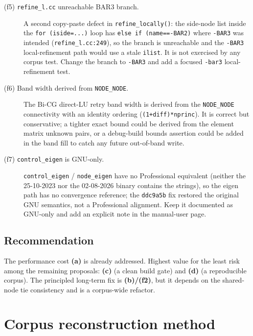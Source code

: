 \documentclass[11pt,a4paper]{report}
\newcommand{\code}[1]{\texttt{#1}}
\begin{document}
\begin{description}
  \item[(f5) \code{refine\_\allowbreak l.cc} unreachable BAR3 branch.] A second copy-paste
        defect in \code{refine\_\allowbreak locally()}: the side-node list inside the
        \code{for (iside=...)} loop has \code{else if (name==-BAR2)} where
        \code{-BAR3} was intended (\code{refine\_\allowbreak l.cc:249}), so the branch is
        unreachable and the \code{-BAR3} local-refinement path would use a stale
        \code{ilist}. It is not exercised by any corpus test. Change the branch
        to \code{-BAR3} and add a focused \code{-bar3} local-refinement test.

  \item[(f6) Band width derived from \code{NODE\_\allowbreak NODE}.] The Bi-CG direct-LU
        retry band width is derived from the \code{NODE\_\allowbreak NODE} connectivity with
        an identity ordering (\code{(1+diff)*nprinc}). It is correct but
        conservative; a tighter exact bound could be derived from the element
        matrix unknown pairs, or a debug-build bounds assertion could be added in
        the band fill to catch any future out-of-band write.

  \item[(f7) \code{control\_\allowbreak eigen} is GNU-only.] \code{control\_\allowbreak eigen} /
        \code{node\_\allowbreak eigen} have no Professional equivalent (neither the
        25-10-2023 nor the 02-08-2026 binary contains the strings), so the eigen
        path has no convergence reference; the \code{ddc9a5b} fix restored the
        original GNU semantics, not a Professional alignment. Keep it documented
        as GNU-only and add an explicit note in the manual-user page.
\end{description}

\section{Recommendation}

The performance cost \textbf{(a)} is already addressed. Highest value for the
least risk among the remaining proposals: \textbf{(c)} (a clean build gate) and
\textbf{(d)} (a reproducible corpus). The principled long-term fix is
\textbf{(b)/(f2)}, but it depends on the shared-node tie consistency and is a
corpus-wide refactor.

\appendix

\chapter{Corpus reconstruction method}
\label{app:reconstruction}
\end{document}
